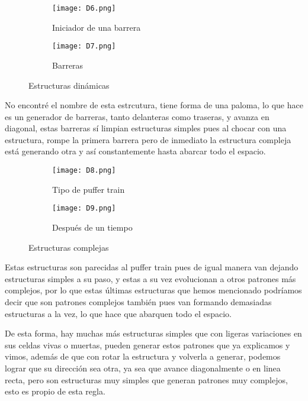 \documentclass{article}
\begin{document}
\begin{itemize}
 	  \begin{figure}[htbp]
 	 	\centering
 	 	\begin{subfigure}{0.48\textwidth}
 	 		\centering
 	 		\texttt{[image: D6.png]}
 	 		\caption{Iniciador de una barrera}
 	 		\label{fig:D1}
 	 	\end{subfigure}
 	 	\hfill
 	 	\begin{subfigure}{0.48\textwidth}
 	 		\centering
 	 		\texttt{[image: D7.png]}
 	 		\caption{Barreras}
 	 		\label{fig:D2}
 	 	\end{subfigure}
 	 	\caption{Estructuras dinámicas}
 	 	\label{fig:A77}
 	 \end{figure}
 	 
 	 No encontré el nombre de esta estrcutura, tiene forma de una paloma, lo que hace es un generador de barreras, tanto delanteras como traseras, y avanza en diagonal, estas barreras sí limpian estructuras simples pues al chocar con una estructura, rompe la primera barrera pero de inmediato la estructura compleja está generando otra y así constantemente hasta abarcar todo el espacio. 
 	 
 	 	\vspace{300pt}
 	 	 \begin{figure}[htbp]
 	 		\centering
 	 		\begin{subfigure}{0.48\textwidth}
 	 			\centering
 	 			\texttt{[image: D8.png]}
 	 			\caption{Tipo de puffer train}
 	 			\label{fig:D1}
 	 		\end{subfigure}
 	 		\hfill
 	 		\begin{subfigure}{0.48\textwidth}
 	 			\centering
 	 			\texttt{[image: D9.png]}
 	 			\caption{Después de un tiempo}
 	 			\label{fig:D2}
 	 		\end{subfigure}
 	 		\caption{Estructuras complejas}
 	 		\label{fig:A77}
 	 	\end{figure}
 	  
 	  Estas estructuras son parecidas al puffer train pues de igual manera van dejando estructuras simples a su paso, y estas a su vez evolucionan a otros patrones más complejos, por lo que estas últimas estructuras que hemos mencionado podríamos decir que son patrones complejos también pues van formando demasiadas estructuras a la vez, lo que hace que abarquen todo el espacio. 
 	  
 	  De esta forma, hay muchas más estructuras simples que con ligeras variaciones en sus celdas vivas o muertas, pueden generar estos patrones que ya explicamos y vimos, además de que con rotar la estructura y volverla a generar, podemos lograr que su dirección sea otra, ya sea que avance diagonalmente o en linea recta, pero son estructuras muy simples que generan patrones muy complejos, esto es propio de esta regla. 
 	 \end{itemize}
 	 
\end{document}
